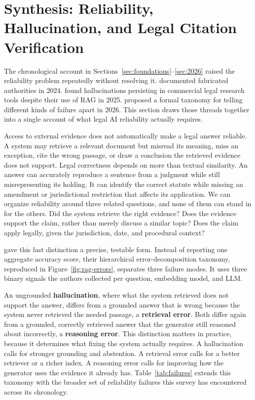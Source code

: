 \section{Synthesis: Reliability, Hallucination, and Legal Citation Verification}
\label{sec:reliability}

The chronological account in Sections~\ref{sec:foundations}--\ref{sec:2026} raised the reliability
problem repeatedly without resolving it. \citet{dahl2024} documented fabricated authorities in 2024.
\citet{magesh2025} found hallucinations persisting in commercial legal research tools despite their
use of RAG in 2025. \citet{butler2026} proposed a formal taxonomy for telling different kinds of
failure apart in 2026. This section draws those threads together into a single account of what legal
AI reliability actually requires.

Access to external evidence does not automatically make a legal answer reliable. A system may
retrieve a relevant document but misread its meaning, miss an exception, cite the wrong passage, or
draw a conclusion the retrieved evidence does not support. Legal correctness depends on more than
textual similarity. An answer can accurately reproduce a sentence from a judgment while still
misrepresenting its holding. It can identify the correct statute while missing an amendment or
jurisdictional restriction that affects its application. We can organize reliability around three
related questions, and none of them can stand in for the others. Did the system retrieve the right
evidence? Does the evidence support the claim, rather than merely discuss a similar topic? Does the
claim apply legally, given the jurisdiction, date, and procedural context?

\citet{butler2026} gave this last distinction a precise, testable form. Instead of reporting one
aggregate accuracy score, their hierarchical error-decomposition taxonomy, reproduced in
Figure~\ref{fig:rag-errors}, separates three failure modes. It uses three binary signals the authors
collected per question, embedding model, and LLM.



An ungrounded \textbf{hallucination}, where what the system retrieved does not support the answer,
differs from a grounded answer that is wrong because the system never retrieved the needed passage,
a \textbf{retrieval error}. Both differ again from a grounded, correctly retrieved answer that the
generator still reasoned about incorrectly, a \textbf{reasoning error}. This distinction matters in
practice, because it determines what fixing the system actually requires. A hallucination calls for
stronger grounding and abstention. A retrieval error calls for a better retriever or a richer index.
A reasoning error calls for improving how the generator uses the evidence it already has.
Table~\ref{tab:failures} extends this taxonomy with the broader set of reliability failures this
survey has encountered across its chronology.

